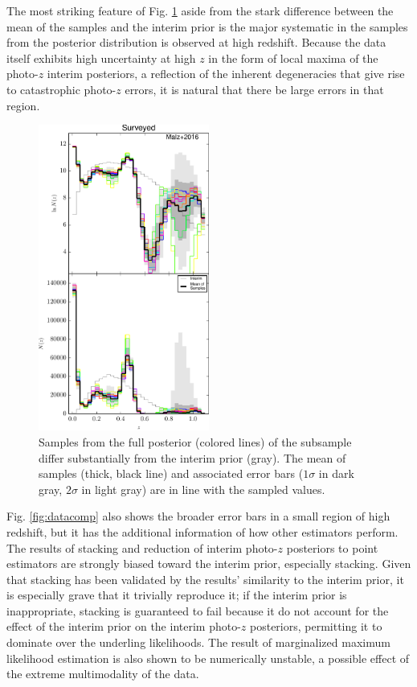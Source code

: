 \documentclass[preprint]{aastex}
\begin{document}
The most striking feature of Fig. \ref{fig:dataparam} aside from the stark 
difference between the mean of the samples and the interim prior is the major 
systematic in the samples from the posterior distribution is observed at high 
redshift.  Because the data itself exhibits high uncertainty at high $z$ in the 
form of local maxima of the photo-$z$ interim posteriors, a reflection of the 
inherent degeneracies that give rise to catastrophic photo-$z$ errors, it is 
natural that there be large errors in that region.  

\begin{figure}
\includegraphics[width=0.5\textwidth]{figs/boss/samps.pdf}
\caption{Samples from the full posterior (colored lines) of the subsample 
differ substantially from the interim prior (gray).  The mean of samples 
(thick, black line) and associated error bars ($1\sigma$ in dark gray, 
$2\sigma$ in light gray) are in line with the sampled values.}
\label{fig:dataparam}
\end{figure}

Fig. \ref{fig:datacomp} also shows the broader error bars in a small region of 
high redshift, but it has the additional information of how other estimators 
perform.  The results of stacking and reduction of interim photo-$z$ posteriors 
to point estimators are strongly biased toward the interim prior, especially 
stacking.  Given that stacking has been validated by the results' similarity to 
the interim prior, it is especially grave that it trivially reproduce it; if 
the interim prior is inappropriate, stacking is guaranteed to fail because it 
do not account for the effect of the interim prior on the interim photo-$z$ 
posteriors, permitting it to dominate over the underling likelihoods.  The 
result of marginalized maximum likelihood estimation is also shown to be 
numerically unstable, a possible effect of the extreme multimodality of the 
data.  
\end{document}
